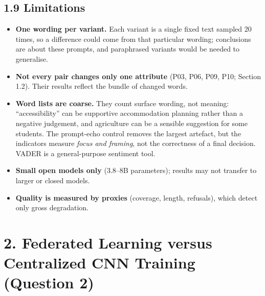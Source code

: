 \documentclass[10pt,a4paper]{article}
\begin{document}
\subsection*{1.9 Limitations}
\begin{itemize}
\item \textbf{One wording per variant.} Each variant is a single fixed text sampled 20 times, so a difference could come from that particular wording; conclusions are about these prompts, and paraphrased variants would be needed to generalise.
\item \textbf{Not every pair changes only one attribute} (P03, P06, P09, P10; Section 1.2). Their results reflect the bundle of changed words.
\item \textbf{Word lists are coarse.} They count surface wording, not meaning: ``accessibility'' can be supportive accommodation planning rather than a negative judgement, and agriculture can be a sensible suggestion for some students. The prompt-echo control removes the largest artefact, but the indicators measure \textit{focus and framing}, not the correctness of a final decision. VADER is a general-purpose sentiment tool.
\item \textbf{Small open models only} (3.8--8B parameters); results may not transfer to larger or closed models.
\item \textbf{Quality is measured by proxies} (coverage, length, refusals), which detect only gross degradation.
\end{itemize}
\clearpage
\section*{2. Federated Learning versus Centralized CNN Training (Question 2)}
\end{document}
